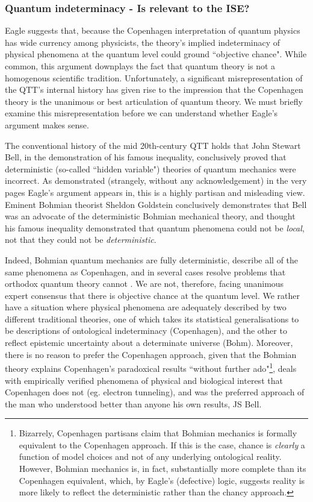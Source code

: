 \subsubsection{Quantum indeterminacy - Is relevant to the ISE?}
Eagle suggests that, because the Copenhagen interpretation of quantum physics has wide currency among physicists, the theory's implied indeterminacy of physical phenomena at the quantum level could ground ``objective chance". While common, this argument downplays the fact that quantum theory is not a homogenous scientific tradition. Unfortunately, a significant misrepresentation of the QTT's internal history has given rise to the impression that the Copenhagen theory is the unanimous or best articulation of quantum theory. We must briefly examine this misrepresentation before we can understand whether Eagle's argument makes sense.

The conventional history of the mid 20th-century QTT holds that John Stewart Bell, in the demonstration of his famous inequality, conclusively proved that deterministic (so-called ``hidden variable") theories of quantum mechanics were incorrect. As demonstrated (strangely, without any acknowledgement) in the very pages Eagle's argument appears in, this is a highly partisan and misleading view. Eminent Bohmian theorist Sheldon Goldstein conclusively demonstrates that Bell was an advocate of the deterministic Bohmian mechanical theory, and thought his famous inequality demonstrated that quantum phenomena could not be \textit{local}, not that they could not be \textit{deterministic}\cite{Goldstein2017}.

Indeed, Bohmian quantum mechanics are fully deterministic, describe all of the same phenomena as Copenhagen, and in several cases resolve problems that orthodox quantum theory cannot \cite{Goldstein2017}. We are not, therefore, facing unanimous expert consensus that there is objective chance at the quantum level. We rather have a situation where physical phenomena are adequately described by two different traditional theories, one of which takes its statistical generalisations to be descriptions of ontological indeterminacy (Copenhagen), and the other to reflect epistemic uncertainty about a determinate universe (Bohm). Moreover, there is no reason to prefer the Copenhagen approach, given that the Bohmian theory explains Copenhagen's paradoxical results ``without further ado"\cite{Goldstein2017}\footnote{Bizarrely, Copenhagen partisans claim that Bohmian mechanics is formally equivalent to the Copenhagen approach. If this is the case, chance is \textit{clearly} a function of model choices and not of any underlying ontological reality. However, Bohmian mechanics is, in fact, substantially more complete than its Copenhagen equivalent, which, by Eagle's (defective) logic, suggests reality is more likely to reflect the deterministic rather than the chancy approach.}, deals with empirically verified phenomena of physical and biological interest that Copenhagen does not (eg. electron tunneling), and was the preferred approach of the man who understood better than anyone his own results, JS Bell.

